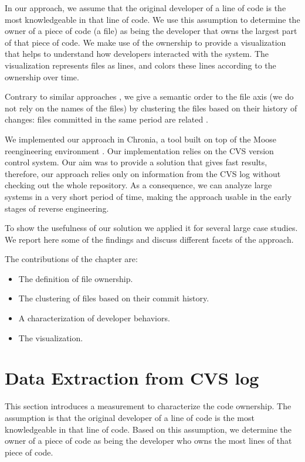 In our approach, we assume that the original developer of a line of code is the most knowledgeable in that line of code. We use this assumption to determine the owner of a piece of code (\eg a file) as being the developer that owns the largest part of that piece of code. We make use of the ownership to provide a visualization that helps to understand how developers interacted with the system. The visualization represents files as lines, and colors these lines according to the ownership over time.

Contrary to similar approaches \cite{Ryss04a}, we give a semantic order to the file axis (\ie we do not rely on the names of the files) by clustering the files based on their history of changes: files committed in the same period are related \cite{Gall98a}.

We implemented our approach in Chronia, a tool built on top of the Moose reengineering environment \cite{Duca05a}. Our implementation relies on the CVS version control system. Our aim was to provide a solution that gives fast results, therefore, our approach relies only on information from the CVS log without checking out the whole repository. As a consequence, we can analyze large systems in a very short period of time, making the approach usable in the early stages of reverse engineering.

To show the usefulness of our solution we applied it for several large case studies. We report here some of the findings and discuss different facets of the approach.

The contributions of the chapter are:
\begin{itemize}
\item The definition of file ownership.
\item The clustering of files based on their commit history.
\item A characterization of developer behaviors.
\item The \omap visualization.
\end{itemize}

\section{Data Extraction from CVS log}\label{sec:ownership}

This section introduces a measurement to characterize the code ownership. The assumption is that the original developer of a line of code is the most knowledgeable in that line of code. Based on this assumption, we determine the owner of a piece of code as being the developer who owns the most lines  of that piece of code.

